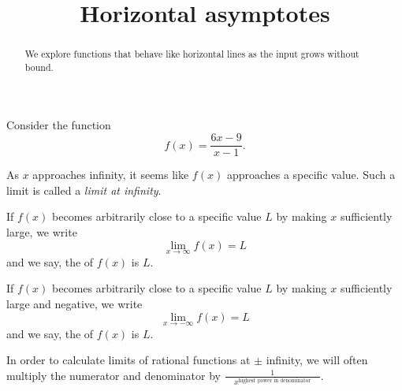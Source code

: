 \documentclass{ximera}
\title[Dig-In:]{Horizontal asymptotes}
\begin{document}
\begin{abstract}
We explore functions that behave like horizontal lines as the input
grows without bound.
\end{abstract}
\maketitle



Consider the function
\[
f(x) = \frac{6x-9}{x-1}.
\]
\begin{image}
\end{image}
As $x$ approaches infinity, it seems like $f(x)$ approaches a specific
value. Such a limit is called a \textit{limit at infinity}.


\begin{definition}\label{def:limitAtInfty}
If $f(x)$ becomes arbitrarily close to a specific value $L$ by making
$x$ sufficiently large, we write
\[
\lim_{x\to \infty} f(x) = L
\]
and we say, the  of $f(x)$ is $L$.  

If $f(x)$ becomes arbitrarily close to a specific value $L$ by making
$x$ sufficiently large and negative, we write
\[
\lim_{x\to -\infty} f(x) = L
\]
and we say, the  of $f(x)$ is $L$.  
\end{definition}

In order to calculate limits of rational functions at $\pm$ infinity, we will often multiply the numerator and denominator by $\displaystyle\frac{1}{\phantom{xx}x^{\text{highest power in denominator}}\phantom{xx}}$.
\end{document}
